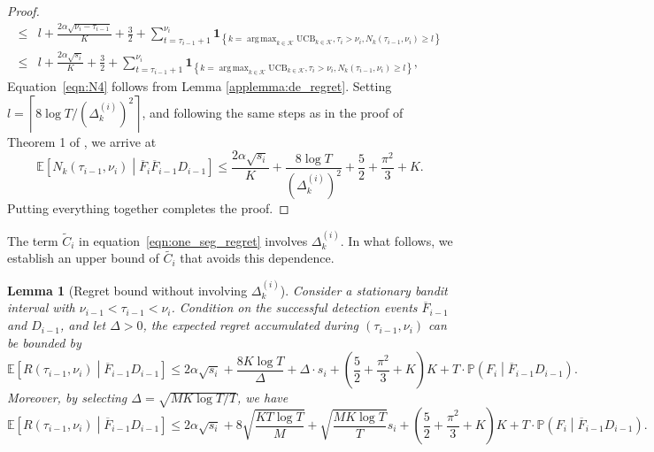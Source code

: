 \documentclass[twoside]{article}
\def\Eqref#1{Equation~\ref{#1}}
\def\1{\bm{1}}
\def\gK{{\mathcal{K}}}
\newcommand{\E}{\mathbb{E}}
\DeclareMathOperator*{\argmax}{arg\,max}
\theoremstyle{plain}
\newtheorem{lemma}[theorem]{Lemma}
\theoremstyle{definition}
\theoremstyle{remark}
\begin{document}
\begin{proof}
\begin{subequations}
\begin{align}
            \leq &l+\frac{2\alpha\sqrt{\nu_{i}-\tau_{i-1}}}{K}+\frac{3}{2}+\sum^{\nu_{i}}_{t=\tau_{i-1}+1}\1_{\left\{ k=\argmax_{k\in\gK} \mathrm{UCB}_{k\in\gK}, \tau_{i}>\nu_{i}, N_{k}\left(\tau_{i-1},\nu_{i}\right)\geq l\right\}}\label{eqn:N4}\\
            \leq &l+\frac{2\alpha\sqrt{s_{i}}}{K}+\frac{3}{2}+\sum^{\nu_{i}}_{t=\tau_{i-1}+1}\1_{\left\{ k=\argmax_{k\in\gK} \mathrm{UCB}_{k\in\gK}, \tau_{i}>\nu_{i}, N_{k}\left(\tau_{i-1},\nu_{i}\right)\geq l\right\}},
        \end{align}
    \end{subequations}
    \Eqref{eqn:N4} follows from Lemma \ref{applemma:de_regret}.
    Setting $l=\left\lceil 8\log T/\left(\Delta^{(i)}_{k}\right)^{2} \right\rceil $, and following the same steps as in the proof of Theorem 1 of \cite{auer2002finite}, we arrive at
    \begin{equation}
        \E\left[N_{k}\left(\tau_{i-1},\nu_{i}\right)\middle|\overline{F}_{i}\overline{F}_{i-1}D_{i-1}\right]\leq \frac{2\alpha\sqrt{s_{i}}}{K}+\frac{8\log T}{\left(\Delta^{(i)}_{k}\right)^{2}}+\frac{5}{2}+\frac{\pi^{2}}{3}+K.\label{eqn:N_one_seg}
    \end{equation}
    Putting everything together completes the proof.
\end{proof}


The term $\tilde{C}_{i}$ in equation~\ref{eqn:one_seg_regret} involves  $\Delta_k^{(i)}$. In what follows, we establish an upper bound of $\tilde{C_{i}}$ that avoids this dependence.
\begin{lemma}[Regret bound without involving $\Delta_k^{(i)}$]\label{applemma:rewrite_C}
    Consider a stationary bandit interval with $\nu_{i-1}<\tau_{i-1}<\nu_{i}$. Condition on the successful detection events $\overline{F}_{i-1}$ and $D_{i-1}$, and let $\Delta>0$, the expected regret accumulated during $\left(\tau_{i-1},\nu_{i}\right)$ can be bounded by
    \begin{equation}
        \E\left[R\left(\tau_{i-1},\nu_{i}\right)\middle|\overline{F}_{i-1}D_{i-1} \right]\leq 2\alpha\sqrt{s_{i}}+\frac{8K\log{T}}{\Delta}+\Delta\cdot s_{i}+\left(\frac{5}{2}+\frac{\pi^{2}}{3}+K\right)K+T\cdot \mathbb{P}\left(F_{i}\middle|\overline{F}_{i-1}D_{i-1}\right).\label{eqn:one_seg_regret_no_gap}
    \end{equation}
    Moreover, by selecting $\Delta=\sqrt{MK\log{T}/T}$, we have
    \begin{equation}
        \E\left[R\left(\tau_{i-1},\nu_{i}\right)\middle|\overline{F}_{i-1}D_{i-1}\right]
        \leq 2\alpha\sqrt{s_{i}}+8\sqrt{\frac{KT\log{T}}{M}}+\sqrt{\frac{MK\log{T}}{T}} s_{i}+\left(\frac{5}{2}+\frac{\pi^{2}}{3}+K\right)K+T\cdot \mathbb{P}\left(F_{i}\middle|\overline{F}_{i-1}D_{i-1}\right).
    \end{equation}
\end{lemma}
\end{document}

